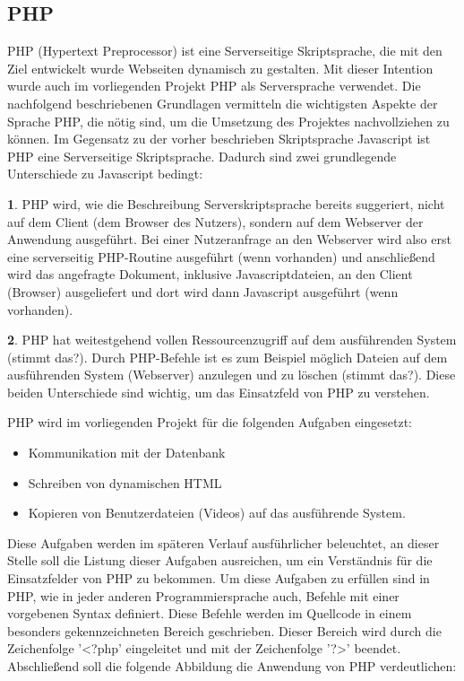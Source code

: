\subsection{PHP}
\label{sec:Php}

PHP (Hypertext Preprocessor) ist eine Serverseitige Skriptsprache, die mit den Ziel entwickelt wurde Webseiten dynamisch
zu gestalten.
Mit dieser Intention wurde auch im vorliegenden Projekt PHP als Serversprache verwendet. Die nachfolgend beschriebenen
Grundlagen vermitteln die wichtigsten Aspekte der Sprache PHP, die nötig sind, um die Umsetzung des Projektes
nachvollziehen zu können.
Im Gegensatz zu der vorher beschrieben Skriptsprache Javascript ist PHP eine Serverseitige Skriptsprache. Dadurch sind
zwei grundlegende Unterschiede zu Javascript bedingt:

\textbf{1}. PHP wird, wie die Beschreibung Serverskriptsprache bereits suggeriert, nicht auf dem Client (dem Browser des Nutzers),
sondern auf dem Webserver der Anwendung ausgeführt. Bei einer Nutzeranfrage an den Webserver wird also erst eine
serverseitig PHP-Routine ausgeführt (wenn vorhanden) und anschließend wird das angefragte Dokument, inklusive
Javascriptdateien, an den Client (Browser) ausgeliefert und dort wird dann Javascript ausgeführt (wenn vorhanden).

\textbf{2}. PHP hat weitestgehend vollen Ressourcenzugriff auf dem ausführenden System (stimmt das?). Durch PHP-Befehle ist es zum
Beispiel möglich Dateien auf dem ausführenden System (Webserver) anzulegen und zu löschen (stimmt das?).
Diese beiden Unterschiede sind wichtig, um das Einsatzfeld von PHP zu verstehen.

PHP wird im vorliegenden Projekt für die folgenden Aufgaben eingesetzt:
\begin{itemize}
  \item Kommunikation mit der Datenbank
  \item Schreiben von dynamischen HTML
  \item Kopieren von Benutzerdateien (Videos) auf das ausführende System.
\end{itemize}

Diese Aufgaben werden im späteren Verlauf ausführlicher beleuchtet, an dieser Stelle soll die Listung dieser Aufgaben
ausreichen, um ein Verständnis für die Einsatzfelder von PHP zu bekommen.
Um diese Aufgaben zu erfüllen sind in PHP, wie in jeder anderen Programmiersprache auch, Befehle mit einer vorgebenen
Syntax definiert. Diese Befehle werden im Quellcode in einem besonders gekennzeichneten Bereich geschrieben. Dieser
Bereich wird durch die Zeichenfolge '<?php' eingeleitet und mit der Zeichenfolge '?>' beendet.
Abschließend soll die folgende Abbildung die Anwendung von PHP verdeutlichen:



